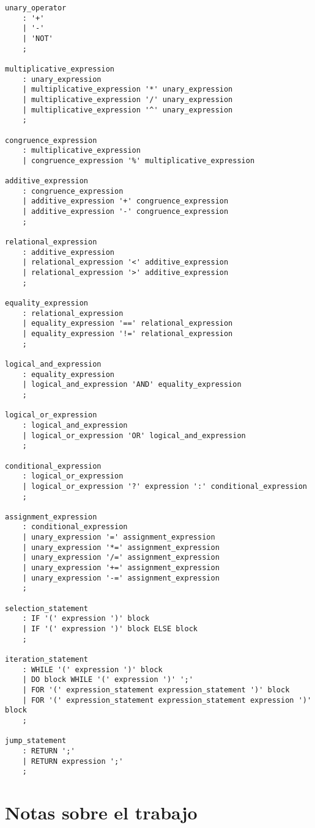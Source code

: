 \begin{verbatim}
unary_operator
    : '+'
    | '-'
    | 'NOT'
    ;

multiplicative_expression
    : unary_expression
    | multiplicative_expression '*' unary_expression
    | multiplicative_expression '/' unary_expression
    | multiplicative_expression '^' unary_expression
    ;

congruence_expression
    : multiplicative_expression
    | congruence_expression '%' multiplicative_expression

additive_expression
    : congruence_expression
    | additive_expression '+' congruence_expression
    | additive_expression '-' congruence_expression
    ;

relational_expression
    : additive_expression
    | relational_expression '<' additive_expression
    | relational_expression '>' additive_expression
    ;

equality_expression
    : relational_expression
    | equality_expression '==' relational_expression
    | equality_expression '!=' relational_expression
    ;

logical_and_expression
    : equality_expression
    | logical_and_expression 'AND' equality_expression
    ;

logical_or_expression
    : logical_and_expression
    | logical_or_expression 'OR' logical_and_expression
    ;

conditional_expression
    : logical_or_expression
    | logical_or_expression '?' expression ':' conditional_expression
    ;

assignment_expression
    : conditional_expression
    | unary_expression '=' assignment_expression
    | unary_expression '*=' assignment_expression
    | unary_expression '/=' assignment_expression
    | unary_expression '+=' assignment_expression
    | unary_expression '-=' assignment_expression
    ;

selection_statement
    : IF '(' expression ')' block
    | IF '(' expression ')' block ELSE block
    ;

iteration_statement
    : WHILE '(' expression ')' block
    | DO block WHILE '(' expression ')' ';'
    | FOR '(' expression_statement expression_statement ')' block
    | FOR '(' expression_statement expression_statement expression ')' block
    ;

jump_statement
    : RETURN ';'
    | RETURN expression ';'
    ;

\end{verbatim}

\section{Notas sobre el trabajo}

